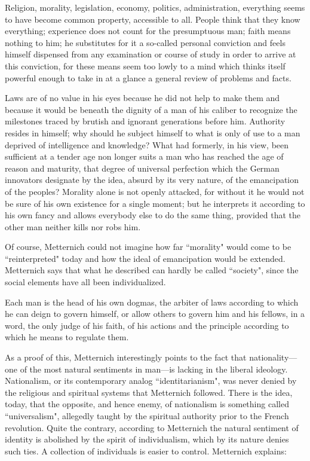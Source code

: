 \begin{quotex}
Religion, morality, legislation, economy, politics, administration, everything seems to have become common property, accessible to all. People think that they know everything; experience does not count for the presumptuous man; faith means nothing to him; he substitutes for it a so-called personal conviction and feels himself dispensed from any examination or course of study in order to arrive at this conviction, for these means seem too lowly to a mind which thinks itself powerful enough to take in at a glance a general review of problems and facts.

Laws are of no value in his eyes because he did not help to make them and because it would be beneath the dignity of a man of his caliber to recognize the milestones traced by brutish and ignorant generations before him. Authority resides in himself; why should he subject himself to what is only of use to a man deprived of intelligence and knowledge? What had formerly, in his view, been sufficient at a tender age non longer suits a man who has reached the age of reason and maturity, that degree of universal perfection which the German innovators designate by the idea, absurd by its very nature, of the emancipation of the peoples? Morality alone is not openly attacked, for without it he would not be sure of his own existence for a single moment; but he interprets it according to his own fancy and allows everybody else to do the same thing, provided that the other man neither kills nor robs him. 

\end{quotex}
Of course, Metternich could not imagine how far ``morality" would come to be ``reinterpreted" today and how the ideal of emancipation would be extended. Metternich says that what he described can hardly be called ``society", since the social elements have all been individualized.

\begin{quotex}
Each man is the head of his own dogmas, the arbiter of laws according to which he can deign to govern himself, or allow others to govern him and his fellows, in a word, the only judge of his faith, of his actions and the principle according to which he means to regulate them. 

\end{quotex}
As a proof of this, Metternich interestingly points to the fact that nationality—one of the most natural sentiments in man—is lacking in the liberal ideology. Nationalism, or its contemporary analog ``identitarianism", was never denied by the religious and spiritual systems that Metternich followed. There is the idea, today, that the opposite, and hence enemy, of nationalism is something called ``universalism", allegedly taught by the spiritual authority prior to the French revolution. Quite the contrary, according to Metternich the natural sentiment of identity is abolished by the spirit of individualism, which by its nature denies such ties. A collection of individuals is easier to control. Metternich explains:

